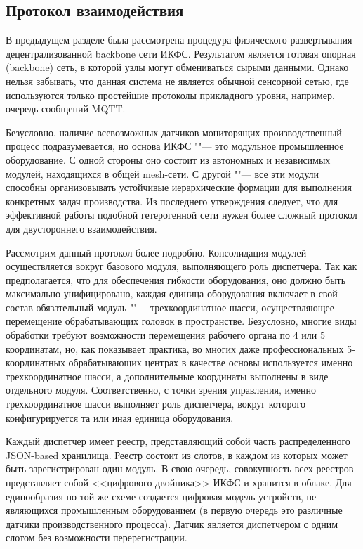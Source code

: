 \subsection{Протокол взаимодействия}

В предыдущем разделе была рассмотрена процедура физического развертывания децентрализованной backbone сети ИКФС. Результатом является готовая опорная  (backbone) сеть, в которой узлы могут обмениваться сырыми данными. Однако нельзя забывать, что данная система не является обычной сенсорной сетью, где используются только простейшие протоколы прикладного уровня, например, очередь сообщений MQTT.

Безусловно, наличие всевозможных датчиков мониторящих производственный процесс подразумевается, но основа ИКФС ""--- это модульное промышленное оборудование. С одной стороны оно состоит из автономных и независимых модулей, находящихся в общей mesh-сети. С другой ""--- все эти модули способны организовывать устойчивые иерархические формации для выполнения конкретных задач производства. Из последнего утверждения следует, что для эффективной работы подобной гетерогенной сети нужен более сложный протокол для двустороннего взаимодействия.

Рассмотрим данный протокол более подробно. Консолидация модулей осуществляется вокруг базового модуля, выполняющего роль диспетчера. Так как предполагается, что для обеспечения гибкости оборудования, оно должно быть максимально унифицировано, каждая единица оборудования включает в свой состав обязательный модуль ""--- трехкоординатное шасси, осуществляющее перемещение обрабатывающих головок в пространстве. Безусловно, многие виды обработки требуют возможности перемещения рабочего органа по 4 или 5 координатам, но, как показывает практика, во многих даже профессиональных 5-координатных обрабатывающих центрах в качестве основы используется именно трехкоординатное шасси, а дополнительные координаты выполнены в виде отдельного модуля. Соответственно, с точки зрения управления, именно трехкоординатное шасси выполняет роль диспетчера, вокруг которого конфигурируется та или иная единица оборудования. 

Каждый диспетчер имеет реестр, представляющий собой часть распределенного JSON-based хранилища. Реестр состоит из слотов, в каждом из которых может быть зарегистрирован один модуль. В свою очередь, совокупность всех реестров представляет собой <<цифрового двойника>> ИКФС и хранится в облаке. Для единообразия по той же схеме создается цифровая модель устройств, не являющихся промышленным оборудованием (в первую очередь это различные датчики производственного процесса). Датчик является диспетчером с одним слотом без возможности перерегистрации.

